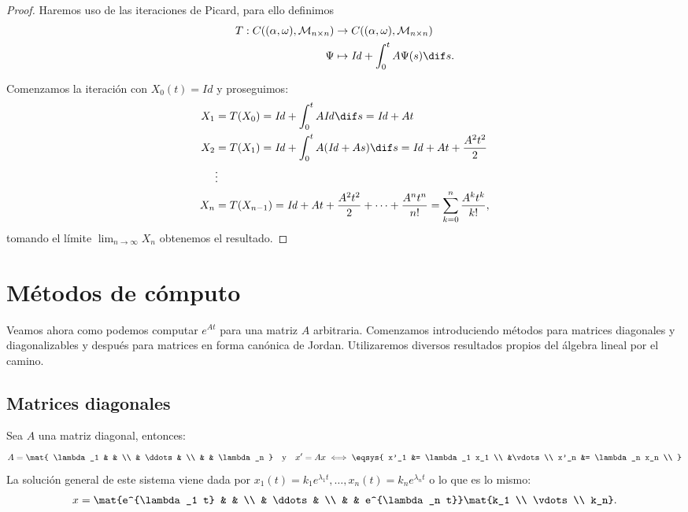 \documentclass[../ecuaciones_diferenciales.tex]{subfiles}
\begin{document}
\begin{proof}
	Haremos uso de las iteraciones de Picard, para ello definimos
	\begin{align*}
		T : C((\alpha, \omega), \mathcal{M}_{n \times n}) & \to
		C((\alpha, \omega), \mathcal{M}_{n \times n})                                                        \\
		\Psi                                              & \mapsto \mathit{Id} + \int_0^t A \Psi(s) \dif s.
	\end{align*}

	Comenzamos la iteración con \(X_0(t) = \mathit{Id}\) y proseguimos:
	\begin{align*}
		X_1 & = T(X_0) = \mathit{Id} + \int_0^t A \mathit{Id} \dif s =
		\mathit{Id} + At                                                      \\
		X_2 & = T(X_1) = \mathit{Id} + \int_0^t A (\mathit{Id} + As) \dif s =
		\mathit{Id} + At + \frac{A^2 t^2}{2}                                  \\
		    & \vdots                                                          \\
		X_n & = T(X_{n - 1}) =
		\mathit{Id} + At + \frac{A^2 t^2}{2} + \cdots + \frac{A^n t^n}{n!}
		= \sum_{k = 0}^n \frac{A^k t^k}{k!},
	\end{align*}
	tomando el límite \(\lim_{n \to \infty} X_n\) obtenemos el resultado.
\end{proof}

\section{Métodos de cómputo}

Veamos ahora como podemos computar \(e^{At}\) para una matriz \(A\) arbitraria.
Comenzamos introduciendo métodos para matrices diagonales y diagonalizables y
después para matrices en forma canónica de Jordan. Utilizaremos diversos
resultados propios del álgebra lineal por el camino.

\subsection{Matrices diagonales}

Sea \(A\) una matriz diagonal, entonces:
\[A = \mat{
		\lambda_1 & & \\
		& \ddots & \\
		& & \lambda_n
	}
	\quad \text{y} \quad
	x' = Ax \iff
	\eqsys{
		x'_1 &= \lambda_1 x_1 \\
		&\vdots \\
		x'_n &= \lambda_n x_n \\
	}
\]
La solución general de este sistema viene dada por
\(x_1(t) = k_1 e^{\lambda_1 t}, \dots, x_n(t) = k_n e^{\lambda_n t}\) o lo que es
lo mismo:
\[x = \mat{e^{\lambda_1 t} & & \\ & \ddots & \\ & & e^{\lambda_n t}}
	\mat{k_1 \\ \vdots \\ k_n}.\]
\end{document}
